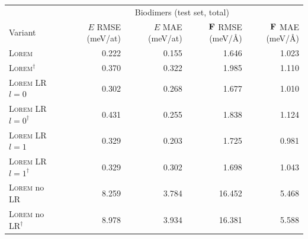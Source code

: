 \begin{tabular}{l | r r r r}
\toprule
  \multicolumn{1}{c}{} & \multicolumn{4}{c}{Biodimers (test set, total)} \\ 
                   Variant  &           $E$ RMSE (meV/at)  &            $E$ MAE (meV/at)  &           $\mathbf{F}$ RMSE (meV/Å)  &            $\mathbf{F}$ MAE (meV/Å) \\ 
\midrule
            \textsc{Lorem}  &                 \num{0.222}  &                 \num{0.155}  &                 \num{1.646}  &                 \num{1.023} \\ 
\textsc{Lorem}$^{\dagger}$  &                 \num{0.370}  &                 \num{0.322}  &                 \num{1.985}  &                 \num{1.110} \\ 
   \textsc{Lorem} LR $l=0$  &                 \num{0.302}  &                 \num{0.268}  &                 \num{1.677}  &                 \num{1.010} \\ 
\textsc{Lorem} LR $l=0^{\dagger}$  &                 \num{0.431}  &                 \num{0.255}  &                 \num{1.838}  &                 \num{1.124} \\ 
   \textsc{Lorem} LR $l=1$  &                 \num{0.329}  &                 \num{0.203}  &                 \num{1.725}  &                 \num{0.981} \\ 
\textsc{Lorem} LR $l=1^{\dagger}$  &                 \num{0.329}  &                 \num{0.302}  &                 \num{1.698}  &                 \num{1.043} \\ 
      \textsc{Lorem} no LR  &                 \num{8.259}  &                 \num{3.784}  &                \num{16.452}  &                 \num{5.468} \\ 
\textsc{Lorem} no LR$^{\dagger}$  &                 \num{8.978}  &                 \num{3.934}  &                \num{16.381}  &                 \num{5.588} \\ 
\bottomrule
\end{tabular}

